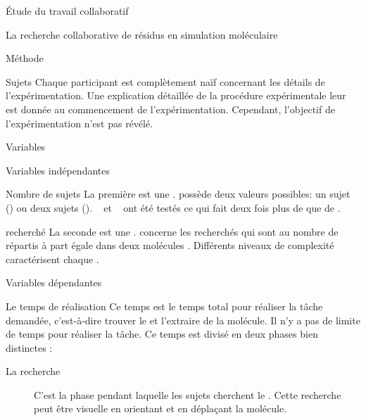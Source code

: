 \documentclass[myfrancais]{mythesis}
\begin{document}
\begin{mypart}{Étude du travail collaboratif}
\begin{mychapter}{La recherche collaborative de résidus en simulation moléculaire}
\begin{mysection}{Méthode}
\begin{mysubsection}{Sujets}
					Chaque participant est complètement naïf concernant les détails de l'expérimentation.
					Une explication détaillée de la procédure expérimentale leur est donnée au commencement de l'expérimentation.
					Cependant, l'objectif de l'expérimentation n'est pas révélé.
				\end{mysubsection}
				\begin{mysubsection}{Variables}
					\begin{mysubsubsection}{Variables indépendantes}
						\begin{myparagraph}{ Nombre de sujets}
							La première  est une .
							 possède deux valeurs possibles: \og un sujet \fg (\mycf {}) ou \og deux sujets \fg (\mycf {}).
							~ et ~ ont été testés ce qui fait deux fois plus de  que de .
						\end{myparagraph}
						\begin{myparagraph}{  recherché}
							La seconde  est une .
							 concerne les  recherchés qui sont au nombre de  répartis à part égale dans deux molécules .
							Différents niveaux de complexité caractérisent chaque  .
						\end{myparagraph}
					\end{mysubsubsection}
					\begin{mysubsubsection}{Variables dépendantes}
						\begin{myparagraph}{ Le temps de réalisation}
							Ce temps est le temps total pour réaliser la tâche demandée, c'est-à-dire trouver le  et l'extraire de la molécule.
							Il n'y a pas de limite de temps pour réaliser la tâche.
							Ce temps est divisé en deux phases bien distinctes :
							\begin{description}
								\item[La recherche] C'est la phase pendant laquelle les sujets cherchent le .
									Cette recherche peut être visuelle en orientant et en déplaçant la molécule.

\end{description}
\end{myparagraph}
\end{mysubsubsection}
\end{mysubsection}
\end{mysection}
\end{mychapter}
\end{mypart}
\end{document}
